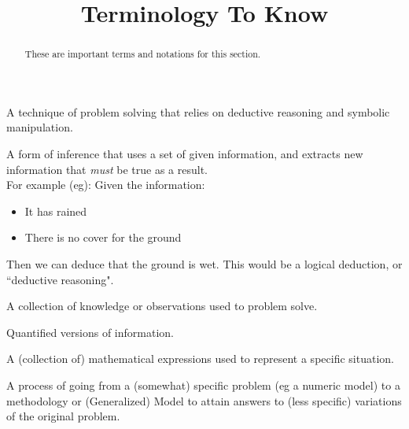 \documentclass{ximeraXloud}
\title{Terminology To Know}
\begin{document}
\begin{abstract}
    These are important terms and notations for this section.
\end{abstract}
\maketitle

\begin{definition}
    A technique of problem solving that relies on deductive reasoning and symbolic manipulation.
\end{definition}

\begin{definition}
    A form of inference that uses a set of given information, and extracts new information that \emph{must} be true as a result. \\For example (eg): Given the information:
    \begin{itemize}
        \item It has rained 
        \item There is no cover for the ground 
    \end{itemize}
    Then we can deduce that the ground is wet. This would be a logical deduction, or ``deductive reasoning".
\end{definition}

\begin{definition}[Information]
    A collection of knowledge or observations used to problem solve.
\end{definition}

\begin{definition}[Data]
    Quantified versions of information.
\end{definition}

\begin{definition}[Model]
    A (collection of) mathematical expressions used to represent a specific situation.
\end{definition}

\begin{definition}[Generalize]
    A process of going from a (somewhat) specific problem (eg a numeric model) to a methodology or (Generalized) Model to attain answers to (less specific) variations of the original problem.
\end{definition}
\end{document}
